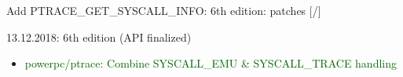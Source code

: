 \documentclass[unicode,aspectratio=169,xcolor={table,dvipsnames,usernames}]{beamer}
\begin{document}
\begin{frame}{Add PTRACE\_GET\_SYSCALL\_INFO: 6th edition: patches \hfill [\insertframenumber/\inserttotalframenumber]}
\begin{block}{13.12.2018: 6th edition (API finalized)}
\begin{itemize}
\begin{columns}
\begin{itemize}
				\item \textcolor{darkgreen}{xtensa: define syscall\_get\_* functions}
				\item Move EM\_UNICORE to uapi/linux/elf-em.h
				\item unicore32: add asm/syscall.h
				\item syscall\_get\_arch: add "struct task\_struct *" argument
				\item ptrace: add PTRACE\_GET\_SYSCALL\_INFO request
				\item selftests/ptrace: add a test case for PTRACE\_GET\_SYSCALL\_INFO
			\end{itemize}
	\end{columns}
	\item \textcolor{darkgreen}{powerpc/ptrace: Combine SYSCALL\_EMU \& SYSCALL\_TRACE handling}
\end{itemize}
\end{block}
\end{frame}
\end{document}
